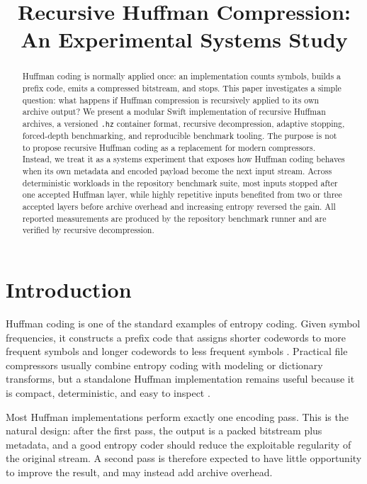 \documentclass[conference]{IEEEtran}
\title{Recursive Huffman Compression: An Experimental Systems Study}
\author{
\IEEEauthorblockN{Hz Project}
\IEEEauthorblockA{Reference Swift implementation and benchmark suite}
}
\begin{document}
\maketitle

\begin{abstract}
Huffman coding is normally applied once: an implementation counts symbols, builds a prefix code, emits a compressed bitstream, and stops. This paper investigates a simple question: what happens if Huffman compression is recursively applied to its own archive output? We present a modular Swift implementation of recursive Huffman archives, a versioned \texttt{.hz} container format, recursive decompression, adaptive stopping, forced-depth benchmarking, and reproducible benchmark tooling. The purpose is not to propose recursive Huffman coding as a replacement for modern compressors. Instead, we treat it as a systems experiment that exposes how Huffman coding behaves when its own metadata and encoded payload become the next input stream. Across deterministic workloads in the repository benchmark suite, most inputs stopped after one accepted Huffman layer, while highly repetitive inputs benefited from two or three accepted layers before archive overhead and increasing entropy reversed the gain. All reported measurements are produced by the repository benchmark runner and are verified by recursive decompression.
\end{abstract}

\section{Introduction}

Huffman coding is one of the standard examples of entropy coding. Given symbol frequencies, it constructs a prefix code that assigns shorter codewords to more frequent symbols and longer codewords to less frequent symbols \cite{huffman1952method}. Practical file compressors usually combine entropy coding with modeling or dictionary transforms, but a standalone Huffman implementation remains useful because it is compact, deterministic, and easy to inspect \cite{sayood2017introduction}.

Most Huffman implementations perform exactly one encoding pass. This is the natural design: after the first pass, the output is a packed bitstream plus metadata, and a good entropy coder should reduce the exploitable regularity of the original stream. A second pass is therefore expected to have little opportunity to improve the result, and may instead add archive overhead.
\end{document}

